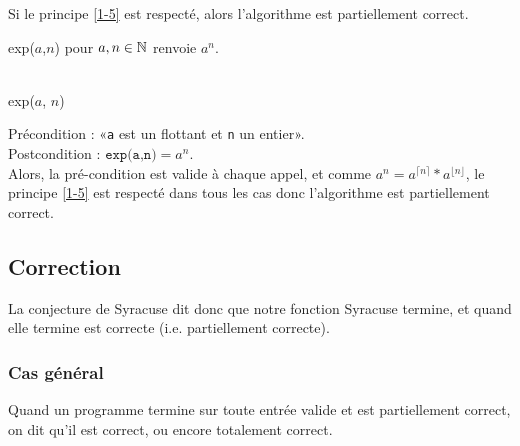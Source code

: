 \begin{theorem}
	Si le principe \ref{1-5} est respecté, alors l'algorithme est partiellement correct.
\end{theorem}

\begin{example}
	\label{1-7}
	exp($a$,$n$) pour $a,n\in \mathbb{N}$ renvoie $a^n$.\\\\
	\begin{minipage}{0.5\linewidth}
		\begin{algorithm}[H]
			\caption{exp($a$, $n$)}
			\end{algorithm}
	\end{minipage} \quad \begin{minipage}{0.4\linewidth}
		Précondition : «\texttt a est un flottant et \texttt n un entier».\\
		Postcondition : $\texttt{exp(a,n)} = a^n$.\\
		Alors, la pré-condition est valide à chaque appel, et comme $a^n = a^{\lceil n \rceil} * a^{\lfloor n \rfloor}$, le principe \ref{1-5} est respecté dans tous les cas donc l'algorithme est partiellement correct.
	\end{minipage}
\end{example}

\subsection{Correction}

La conjecture de Syracuse dit donc que notre fonction Syracuse termine, et quand elle termine est correcte (i.e. partiellement correcte).

\subsubsection{Cas général}

\begin{definition}
	Quand un programme termine sur toute entrée valide et est partiellement correct, on dit qu'il est correct, ou encore totalement correct.
\end{definition}

